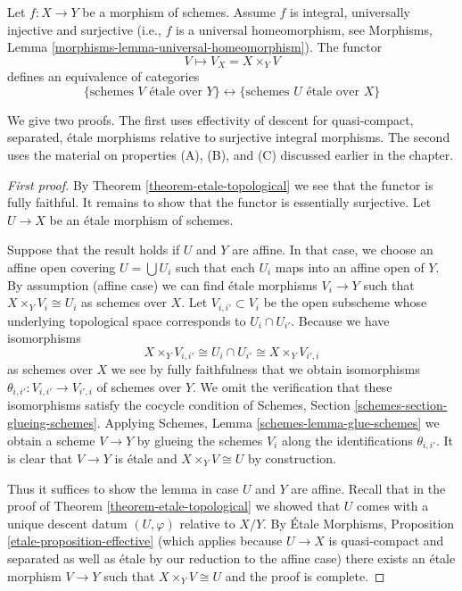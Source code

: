 \begin{theorem}
\label{theorem-topological-invariance}
\begin{reference}
\cite[IV Theorem 18.1.2]{EGA}
\end{reference}
Let $f : X \to Y$ be a morphism of schemes.
Assume $f$ is integral, universally injective and surjective
(i.e., $f$ is a universal homeomorphism, see
Morphisms, Lemma \ref{morphisms-lemma-universal-homeomorphism}).
The functor
$$
V \longmapsto V_X = X \times_Y V
$$
defines an equivalence of categories
$$
\{
\text{schemes }V\text{ \'etale over }Y
\}
\leftrightarrow
\{
\text{schemes }U\text{ \'etale over }X
\}
$$
\end{theorem}

\noindent
We give two proofs. The first uses effectivity of descent
for quasi-compact, separated, \'etale morphisms relative
to surjective integral morphisms. The second uses the material
on properties (A), (B), and (C) discussed earlier in the chapter.

\begin{proof}[First proof]
By Theorem \ref{theorem-etale-topological}
we see that the functor is fully faithful.
It remains to show that the functor is essentially surjective.
Let $U \to X$ be an \'etale morphism of schemes.

\medskip\noindent
Suppose that the result holds if $U$ and $Y$ are affine.
In that case, we choose an affine open covering
$U = \bigcup U_i$ such that each $U_i$ maps
into an affine open of $Y$. By assumption (affine case) we can
find \'etale morphisms $V_i \to Y$ such that $X \times_Y V_i \cong U_i$
as schemes over $X$. Let $V_{i, i'} \subset V_i$
be the open subscheme whose underlying topological space
corresponds to $U_i \cap U_{i'}$. Because we have isomorphisms
$$
X \times_Y V_{i, i'} \cong U_i \cap U_{i'} \cong X \times_Y V_{i', i}
$$
as schemes over $X$ we see by fully faithfulness that we
obtain isomorphisms
$\theta_{i, i'} : V_{i, i'} \to V_{i', i}$ of schemes over $Y$.
We omit the verification that these isomorphisms satisfy the
cocycle condition of Schemes, Section \ref{schemes-section-glueing-schemes}.
Applying Schemes, Lemma \ref{schemes-lemma-glue-schemes}
we obtain a scheme $V \to Y$ by
glueing the schemes $V_i$ along the identifications $\theta_{i, i'}$.
It is clear that $V \to Y$ is \'etale and $X \times_Y V \cong U$
by construction.

\medskip\noindent
Thus it suffices to show the lemma in case $U$ and $Y$ are affine.
Recall that in the proof of Theorem \ref{theorem-etale-topological}
we showed that $U$ comes with a unique descent datum
$(U, \varphi)$ relative to $X/Y$. By
\'Etale Morphisms, Proposition \ref{etale-proposition-effective}
(which applies because $U \to X$ is quasi-compact and separated
as well as \'etale by our reduction to the affine case)
there exists an \'etale morphism $V \to Y$ such that
$X \times_Y V \cong U$ and the proof is complete.
\end{proof}

